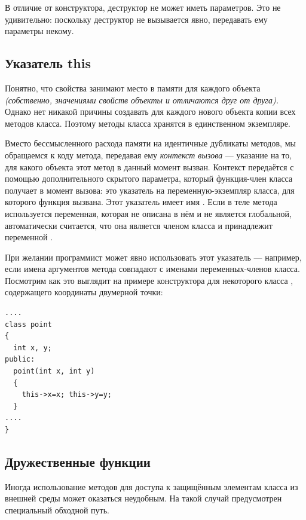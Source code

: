 В отличие от конструктора, деструктор не может иметь параметров. Это не удивительно: поскольку деструктор не вызывается
явно, передавать ему параметры некому.

\subsection[Указатель this]{Указатель this}
Понятно, что свойства занимают место в памяти для каждого объекта \emph{(собственно, значениями
свойств объекты и отличаются друг от друга).} Однако нет никакой причины создавать для каждого нового объекта копии
всех методов класса. Поэтому методы класса хранятся в единственном экземпляре. 

Вместо бессмысленного расхода памяти на идентичные дубликаты методов, мы обращаемся к коду метода, передавая ему
\emph{контекст вызова} --- указание на то, для какого объекта этот метод в данный момент вызван.
Контекст передаётся с  помощью дополнительного скрытого параметра, который функция-член класса получает в момент
вызова: это указатель на переменную-экземпляр класса, для которого функция вызвана. Этот указатель имеет имя
. Если в теле метода используется переменная, которая не описана в нём и не является
глобальной, автоматически считается, что она является членом класса и принадлежит переменной
. 

При желании программист может явно использовать этот указатель --- например, если имена аргументов метода совпадают с
именами переменных-членов класса. Посмотрим как это выглядит на примере конструктора для некоторого класса
, содержащего координаты двумерной точки:
\begin{lstlisting}
....
class point 
{
  int x, y;
public:
  point(int x, int y) 
  {
    this->x=x; this->y=y;
  }
....
}
\end{lstlisting}

\subsection[Дружественные функции]{Дружественные функции}
Иногда использование методов для доступа к защищённым элементам класса из внешней среды может оказаться неудобным. На
такой случай предусмотрен специальный обходной путь.

